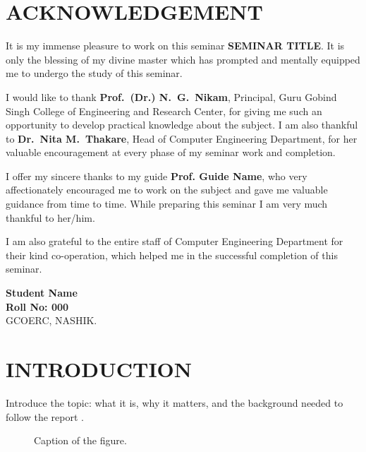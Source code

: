 \documentclass[12pt,a4paper]{report}
\newcommand{\ttitle}{SEMINAR TITLE}            %
\newcommand{\studentname}{Student Name}
\newcommand{\rollno}{000}
\newcommand{\guidename}{Prof. Guide Name}
\newcommand{\unnumchapter}[1]{%
  \chapter*{#1}\addcontentsline{toc}{chapter}{#1}}
\begin{document}
\unnumchapter{ACKNOWLEDGEMENT}
It is my immense pleasure to work on this seminar \textbf{\ttitle}. It is only the blessing of my divine master which has prompted and mentally equipped me to undergo the study of this seminar.

I would like to thank \textbf{Prof.\ (Dr.) N.\ G.\ Nikam}, Principal, Guru Gobind Singh College of Engineering and Research Center, for giving me such an opportunity to develop practical knowledge about the subject. I am also thankful to \textbf{Dr.\ Nita M.\ Thakare}, Head of Computer Engineering Department, for her valuable encouragement at every phase of my seminar work and completion.

I offer my sincere thanks to my guide \textbf{\guidename}, who very affectionately encouraged me to work on the subject and gave me valuable guidance from time to time. While preparing this seminar I am very much thankful to her/him.

I am also grateful to the entire staff of Computer Engineering Department for their kind co-operation, which helped me in the successful completion of this seminar.

\vspace{30pt}
\hfill\begin{minipage}{0.45\textwidth}
\singlespacing
\textbf{\studentname}\\
\textbf{Roll No: \rollno}\\[6pt]
GCOERC, NASHIK.
\end{minipage}
\clearpage

\begingroup
\singlespacing
\renewcommand{\contentsname}{INDEX}
\tableofcontents
\clearpage
\renewcommand{\listfigurename}{LIST OF FIGURES}
\listoffigures
\endgroup
\clearpage

\setcounter{page}{1}
\onehalfspacing

\chapter{INTRODUCTION}
Introduce the topic: what it is, why it matters, and the background needed to follow the report \cite{ref1}.

\begin{figure}[htbp]
\centering
{}
\caption{Caption of the figure.}\label{fig:one}
\end{figure}
\end{document}
